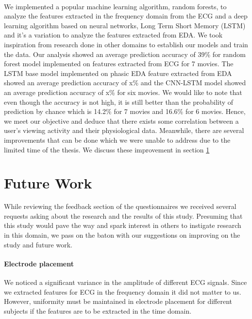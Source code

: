 \paragraph{} We implemented a popular machine learning algorithm, random forests, to analyze the features extracted in the frequency domain from the ECG and a deep learning algorithm based on neural networks, Long Term Short Memory (LSTM) and it's a variation to analyze the features extracted from EDA. We took inspiration from research done in other domains to establish our models and train the data. Our analysis showed an average prediction accuracy of 39\% for random forest model implemented on features extracted from ECG for 7 movies. The LSTM base model implemented on phasic EDA feature extracted from EDA showed an average prediction accuracy of x\% and the CNN-LSTM model showed an average prediction accuracy of x\% for six movies. We would like to note that even though the accuracy is not high, it is still better than the probability of prediction by chance which is 14.2\% for 7 movies and 16.6\% for 6 movies. Hence, we meet our objective and deduce that there exists some correlation between a user's viewing activity and their physiological data. Meanwhile, there are several improvements that can be done which we were unable to address due to the limited time of the thesis. We discuss these improvement in section \ref{sec:future_work}

\section{Future Work}
\label{sec:future_work}
While reviewing the feedback section of the questionnaires we received several requests asking about the research and the results of this study. Presuming that this study would pave the way and spark interest in others to instigate research in this domain, we pass on the baton with our suggestions on improving on the study and future work.

\paragraph{Electrode placement} We noticed a significant variance in the amplitude of different ECG signals. Since we extracted features for ECG in the frequency domain it did not matter to us. However, uniformity must be maintained in electrode placement for different subjects if the features are to be extracted in the time domain.

